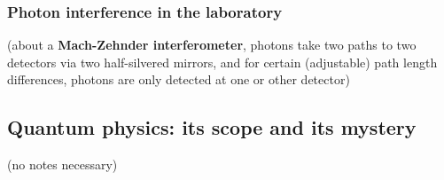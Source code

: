 \documentclass{article}
\begin{document}
\subsubsection{Photon interference in the laboratory}
(about a \textbf{Mach-Zehnder interferometer}, photons take two paths to two detectors via two half-silvered mirrors, and for certain (adjustable) path length differences, photons are only detected at one or other detector)

\subsection{Quantum physics: its scope and its mystery}
(no notes necessary)
\end{document}
